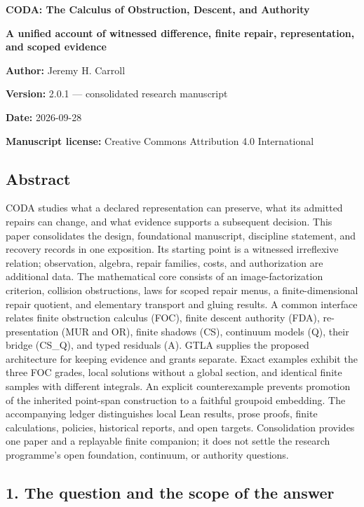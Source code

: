 \documentclass[
  11pt,
]{article}
\begin{document}
\begin{center}
{\Large\bfseries CODA: The Calculus of Obstruction, Descent, and Authority}\par
\textbf{A unified account of witnessed difference, finite repair, representation, and scoped evidence}

\textbf{Author:} Jeremy H. Carroll

\textbf{Version:} 2.0.1 --- consolidated research manuscript

\textbf{Date:} 2026-09-28

\textbf{Manuscript license:} Creative Commons Attribution 4.0 International

\end{center}

\subsection{Abstract}\label{abstract}

CODA studies what a declared representation can preserve, what its admitted repairs can change, and what evidence supports a subsequent decision. This paper consolidates the design, foundational manuscript, discipline statement, and recovery records in one exposition. Its starting point is a witnessed irreflexive relation; observation, algebra, repair families, costs, and authorization are additional data. The mathematical core consists of an image-factorization criterion, collision obstructions, laws for scoped repair menus, a finite-dimensional repair quotient, and elementary transport and gluing results. A common interface relates finite obstruction calculus (FOC), finite descent authority (FDA), re-presentation (MUR and OR), finite shadows (CS), continuum models (Q), their bridge (CS\_Q), and typed residuals (A). GTLA supplies the proposed architecture for keeping evidence and grants separate. Exact examples exhibit the three FOC grades, local solutions without a global section, and identical finite samples with different integrals. An explicit counterexample prevents promotion of the inherited point-span construction to a faithful groupoid embedding. The accompanying ledger distinguishes local Lean results, prose proofs, finite calculations, policies, historical reports, and open targets. Consolidation provides one paper and a replayable finite companion; it does not settle the research programme's open foundation, continuum, or authority questions.

\subsection{1. The question and the scope of the answer}\label{the-question-and-the-scope-of-the-answer}
\end{document}

